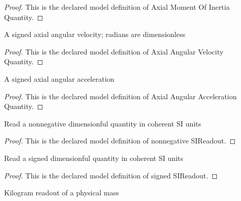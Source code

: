 \begin{proof}
  This is the declared model definition of Axial Moment Of Inertia Quantity.
\end{proof}
\begin{definition}
  \label{def:physics:phyx-mini-0781:phyxminiproblems-problemphyxmini0781-axialangularvelocityquantity}
  A signed axial angular velocity; radians are dimensionless
\end{definition}
\begin{proof}
  This is the declared model definition of Axial Angular Velocity Quantity.
\end{proof}
\begin{definition}
  \label{def:physics:phyx-mini-0781:phyxminiproblems-problemphyxmini0781-axialangularaccelerationquantity}
  A signed axial angular acceleration
\end{definition}
\begin{proof}
  This is the declared model definition of Axial Angular Acceleration Quantity.
\end{proof}
\begin{definition}
  \label{def:physics:phyx-mini-0781:phyxminiproblems-problemphyxmini0781-nonnegativesireadout}
  Read a nonnegative dimensionful quantity in coherent SI units
\end{definition}
\begin{proof}
  This is the declared model definition of nonnegative SIReadout.
\end{proof}
\begin{definition}
  \label{def:physics:phyx-mini-0781:phyxminiproblems-problemphyxmini0781-signedsireadout}
  Read a signed dimensionful quantity in coherent SI units
\end{definition}
\begin{proof}
  This is the declared model definition of signed SIReadout.
\end{proof}
\begin{definition}
  \label{def:physics:phyx-mini-0781:phyxminiproblems-problemphyxmini0781-massinkilograms}
  Kilogram readout of a physical mass
\end{definition}

